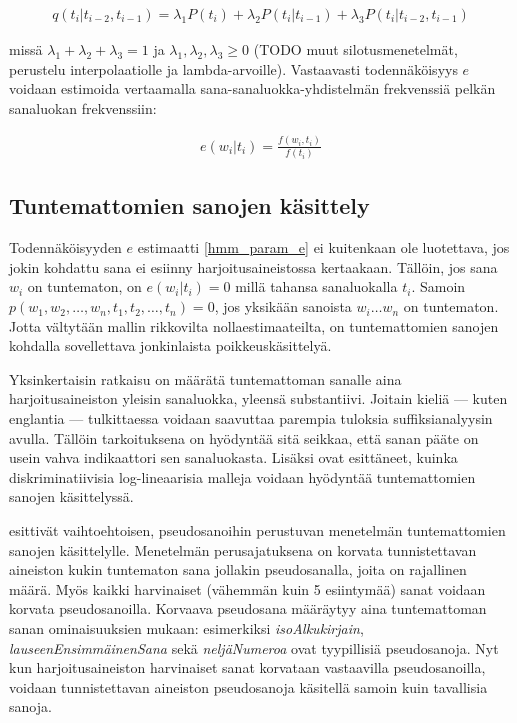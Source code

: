 \documentclass[utf8,bachelor,manualbib]{gradu3}
\begin{document}
\begin{align}
q(t_i | t_{i-2}, t_{i-1}) = \lambda_1 P(t_i) + \lambda_2 P(t_i | t_{i-1}) + \lambda_3 P(t_i | t_{i-2}, t_{i-1})
\end{align}

missä $\lambda_1+\lambda_2+\lambda_3 = 1$ ja $\lambda_1,\lambda_2,\lambda_3 \geq 0$ (TODO muut silotusmenetelmät, perustelu interpolaatiolle ja lambda-arvoille). Vastaavasti todennäköisyys $e$ voidaan estimoida vertaamalla sana-sanaluokka-yhdistelmän frekvenssiä pelkän sanaluokan frekvenssiin:

\begin{align}
e(w_i|t_i) = \frac{f(w_i, t_i)}{f(t_i)}
\label{hmm_param_e}
\end{align}

\subsection{Tuntemattomien sanojen käsittely}

Todennäköisyyden $e$ estimaatti \eqref{hmm_param_e} ei kuitenkaan ole luotettava, jos jokin kohdattu sana ei esiinny harjoitusaineistossa kertaakaan. Tällöin, jos sana $w_i$ on tuntematon, on $e(w_i|t_i)=0$ millä tahansa sanaluokalla $t_i$. Samoin $p(w_1, w_2, \ldots, w_n, t_1, t_2, \ldots, t_n) = 0$, jos yksikään sanoista $w_i \ldots w_n$ on tuntematon. Jotta vältytään mallin rikkovilta nollaestimaateilta, on tuntemattomien sanojen kohdalla sovellettava jonkinlaista poikkeuskäsittelyä.

Yksinkertaisin ratkaisu on määrätä tuntemattoman sanalle aina harjoitusaineiston yleisin sanaluokka, yleensä substantiivi. Joitain kieliä --- kuten englantia --- tulkittaessa voidaan saavuttaa parempia tuloksia suffiksianalyysin \citep{samuelsson1993} avulla. Tällöin tarkoituksena on hyödyntää sitä seikkaa, että sanan pääte on usein vahva indikaattori sen sanaluokasta. Lisäksi \citet{toutanova2003} ovat esittäneet, kuinka diskriminatiivisia log-lineaarisia malleja voidaan hyödyntää tuntemattomien sanojen käsittelyssä.

\citet{bikel1999} esittivät vaihtoehtoisen, pseudosanoihin perustuvan menetelmän tuntemattomien sanojen käsittelylle. Menetelmän perusajatuksena on korvata tunnistettavan aineiston kukin tuntematon sana jollakin pseudosanalla, joita on rajallinen määrä. Myös kaikki harvinaiset (vähemmän kuin 5 esiintymää) sanat voidaan korvata pseudosanoilla. Korvaava pseudosana määräytyy aina tuntemattoman sanan ominaisuuksien mukaan: esimerkiksi \textit{isoAlkukirjain}, \textit{lauseenEnsimmäinenSana} sekä \textit{neljäNumeroa} ovat tyypillisiä pseudosanoja. Nyt kun harjoitusaineiston harvinaiset sanat korvataan vastaavilla pseudosanoilla, voidaan tunnistettavan aineiston pseudosanoja käsitellä samoin kuin tavallisia sanoja.
\end{document}
